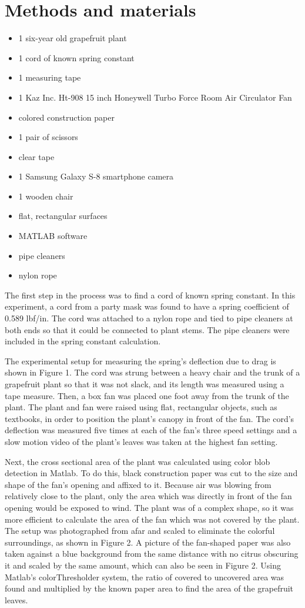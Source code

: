\documentclass{article}
\begin{document}
\section{Methods and materials}
\begin{itemize}
\item 1 six-year old grapefruit plant
\item 1 cord of known spring constant
\item 1 measuring tape
\item 1 Kaz Inc. Ht-908 15 inch Honeywell Turbo Force Room Air Circulator Fan
\item colored construction paper
\item 1 pair of scissors
\item clear tape
\item 1 Samsung Galaxy S-8 smartphone camera
\item 1 wooden chair
\item flat, rectangular surfaces
\item MATLAB software
\item pipe cleaners
\item nylon rope
\end{itemize}

The first step in the process was to find a cord of known spring constant. In this experiment, a cord from a party mask was found to have a spring coefficient of 0.589 lbf/in. The cord was attached to a nylon rope and tied to pipe cleaners at both ends so that it could be connected to plant stems. The pipe cleaners were included in the spring constant calculation.

The experimental setup for measuring the spring's deflection due to drag is shown in Figure 1. The cord was strung between a heavy chair and the trunk of a grapefruit plant so that it was not slack, and its length was measured using a tape measure. Then, a box fan was placed one foot away from the trunk of the plant. The plant and fan were raised using flat, rectangular objects, such as textbooks, in order to position the plant's canopy in front of the fan. The cord's deflection was measured five times at each of the fan's three speed settings and a slow motion video of the plant's leaves was taken at the highest fan setting.

Next, the cross sectional area of the plant was calculated using color blob detection in Matlab. To do this, black construction paper was cut to the size and shape of the fan's opening and affixed to it. Because air was blowing from relatively close to the plant, only the area which was directly in front of the fan opening would be exposed to wind. The plant was of a complex shape, so it was more efficient to calculate the area of the fan which was not covered by the plant. The setup was photographed from afar and scaled to eliminate the colorful surroundings, as shown in Figure 2. A picture of the fan-shaped paper was also taken against a blue background from the same distance with no citrus obscuring it and scaled by the same amount, which can also be seen in Figure 2. Using Matlab's colorThresholder system, the ratio of covered to uncovered area was found and multiplied by the known paper area to find the area of the grapefruit leaves.
\end{document}

